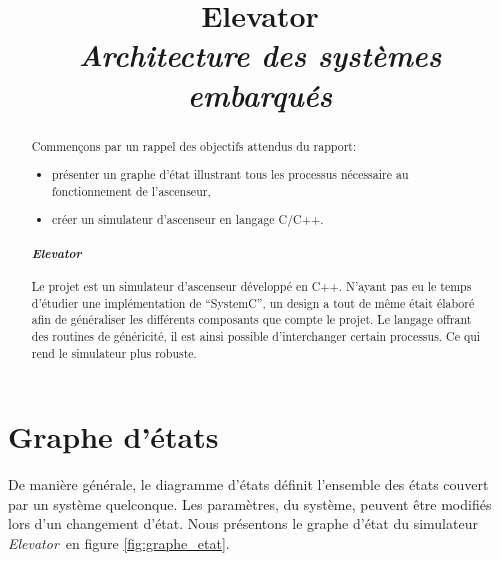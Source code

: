 \documentclass[twocolumn,oneside,10pt]{article}
\title{{\bf Elevator}\\{\em Architecture des systèmes embarqués}}
\newcommand {\elevator}   {{\em Elevator}}
\begin{document}
\maketitle


\begin{abstract}

Commençons par un rappel des objectifs attendus du rapport:\\

\begin{itemize}
\item présenter un graphe d'état illustrant tous les processus nécessaire au fonctionnement de l'ascenseur,
\item créer un simulateur d'ascenseur en langage C/C++.
\end{itemize}

\paragraph{\elevator}

Le projet est un simulateur d'ascenseur développé en C++. N'ayant pas eu le temps d'étudier une implémentation de ``SystemC'', un design a tout de même était élaboré afin de généraliser les différents composants que compte le projet. Le langage offrant des routines de généricité, il est ainsi possible d'interchanger certain processus. Ce qui rend le simulateur plus robuste.

\end{abstract}

\section{Graphe d'états}

De manière générale, le diagramme d'états définit l'ensemble des états couvert par un système quelconque. Les paramètres, du système, peuvent être modifiés lors d'un changement d'état. Nous présentons le graphe d'état du simulateur \elevator\ en figure \ref{fig:graphe_etat}.
\end{document}
